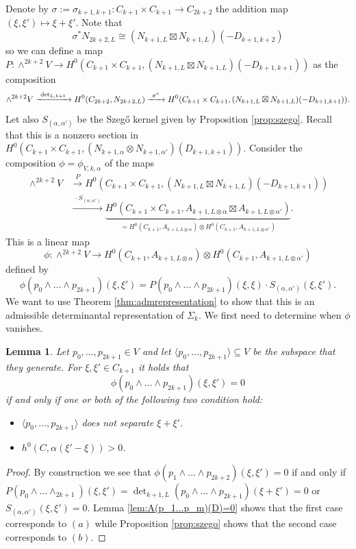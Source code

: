 \documentclass[12pt]{amsart}
\newcounter{thmcounter}
\numberwithin{equation}{section}
\numberwithin{thmcounter}{section}
\newtheorem{lemma}[thmcounter]{Lemma}
\theoremstyle{definition}
\theoremstyle{claim}
\begin{document}
Denote by $\sigma:=\sigma_{k+1,k+1} \colon C_{k+1} \times C_{k+1} \to C_{2k+2}$ the addition map $(\xi, \xi') \mapsto \xi+\xi'$. Note that
\[\sigma^*N_{2k+2,L} \cong (N_{k+1,L}\boxtimes N_{k+1,L})(-D_{k+1,k+2}) \]
so we can define a map $P\colon \wedge^{2k+2}V \to H^0(C_{k+1}\times C_{k+1},(N_{k+1,L}\boxtimes N_{k+1,L})(-D_{k+1,k+1}))$ as the composition
\[
	\wedge^{2k+2} V  \xrightarrow{~\det_{L,k+1}~}  H^0(C_{2k+2}, N_{2k+2,L}) \\
	 \xrightarrow{~\sigma^*~}  H^0(C_{k+1}\times C_{k+1},(N_{k+1,L}\boxtimes N_{k+1,L})(-D_{k+1,k+1})).
\]
Let also $S_{(\alpha,\alpha')}$ be the Szeg\H{o} kernel given by Proposition \ref{prop:szego}. Recall that this is a nonzero section in $H^0(C_{k+1}\times C_{k+1},(N_{k+1,\alpha}\otimes N_{k+1,\alpha'})(D_{k+1,k+1}))$. Consider the composition $\phi=\phi_{V,k,\alpha}$ of the maps
\begin{align*}
	\wedge^{2k+2} V & \xrightarrow{P}  H^0(C_{k+1}\times C_{k+1},(N_{k+1,L}\boxtimes N_{k+1,L})(-D_{k+1,k+1})) \\
	& \xrightarrow{~\cdot S_{(\alpha,\alpha')}~}  \underbrace{H^0(C_{k+1} \times C_{k+1}, A_{k+1, L \otimes \alpha} \boxtimes A_{k+1, L \otimes \alpha'})}_{=H^0(C_{k+1}, A_{k+1, L \otimes \alpha}) \otimes H^0(C_{k+1}, A_{k+1, L \otimes \alpha'})} .
\end{align*}
This is a linear map
$$
\phi \colon \wedge^{2k+2} V \longrightarrow H^0(C_{k+1}, A_{k+1, L \otimes \alpha}) \otimes H^0(C_{k+1}, A_{k+1, L \otimes \alpha'})
$$
defined by
\[ \phi(p_0\wedge \dots \wedge p_{2k+1})(\xi,\xi') = P(p_0\wedge \dots \wedge p_{2k+1})(\xi,\xi)\cdot S_{(\alpha,\alpha')}(\xi,\xi'). \]
We want to use Theorem \ref{thm:admrepresentation} to show that this is an admissible determinantal representation of $\Sigma_k$. We first need to determine when $\phi$ vanishes.

\begin{lemma}\label{lem:phivanishes}
	Let $p_0,\dots,p_{2k+1} \in V$ and let $\langle p_0,\dots,p_{2k+1} \rangle \subseteq V$ be the subspace that they generate. For $\xi,\xi'\in C_{k+1}$ it holds that
	\[ \phi(p_0\wedge \dots \wedge p_{2k+1})(\xi,\xi') = 0 \]
	if and only if one or both of the following two condition hold:
	\begin{itemize}
		\item[$(a)$]  $\langle p_0,\dots,p_{2k+1} \rangle$ does not separate $\xi+\xi'$.
		\item[$(b)$] $h^0(C,\alpha(\xi'-\xi))>0$.
	\end{itemize}
\end{lemma}
\begin{proof}
	By construction we see that $\phi(p_1\wedge \dots \wedge p_{2k+2})(\xi,\xi') = 0$ if and only if $P(p_0\wedge \dots \wedge_{2k+1})(\xi,\xi')=\det_{k+1,L}(p_0\wedge \dots \wedge p_{2k+1})(\xi+\xi')=0$ or $S_{(\alpha,\alpha')}(\xi,\xi')=0$. Lemma \ref{lem:A(p_1...p_m)(D)=0} shows that the first case corresponds to $(a)$ while Proposition \ref{prop:szego} shows that the second case corresponds to $(b)$.
\end{proof}
\end{document}
